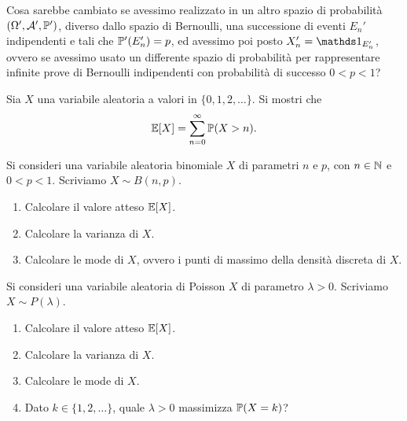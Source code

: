Cosa sarebbe cambiato se avessimo realizzato in un altro spazio di probabilità $(\Omega ' ,\mathcal{A} ' ,\mathbb{P} ')$, diverso dallo spazio di Bernoulli, una successione di eventi $E_{n} ' $ indipendenti e tali che $\mathbb{P} ' (E_{n} ') =p$, ed avessimo poi posto $X_{n} ' =\Ind_{E_{n} ' }$, ovvero se avessimo usato un differente spazio di probabilità per rappresentare infinite prove di Bernoulli indipendenti con probabilità di successo $0< p< 1$?

\Esercizio{$\star$}

Sia $X$ una variabile aleatoria a valori in $\{0,1,2,\dots \}$. Si mostri che
\begin{equation*}
\mathbb{E}[X] =\sum\limits_{n=0}^{\infty }\mathbb{P}(X >n) .
\end{equation*}


Si consideri una variabile aleatoria binomiale $X$ di parametri $n$ e $p$, con $n\in \mathbb{N}$ e $0< p< 1$. Scriviamo $X\sim B(n,p)$.
\begin{enumerate}
\item Calcolare il valore atteso $\mathbb{E}[X]$.
\item Calcolare la varianza di $X$.
\item Calcolare le mode di $X$, ovvero i punti di massimo della densità discreta di $X$.
\end{enumerate}


Si consideri una variabile aleatoria di Poisson $X$ di parametro $\lambda  >0$. Scriviamo $X\sim P(\lambda)$.
\begin{enumerate}
\item Calcolare il valore atteso $\mathbb{E}[X]$.
\item Calcolare la varianza di $X$.
\item Calcolare le mode di $X$.
\item Dato $k\in \{1,2,\dots \}$, quale $\lambda  >0$ massimizza $\mathbb{P}(X=k)$?
\end{enumerate}


